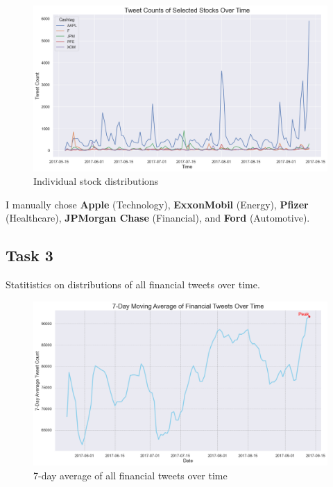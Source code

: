 \documentclass[12pt]{article}
\begin{document}
\begin{figure}[h!]
    \centering
    \includegraphics[width=1\textwidth]{P1.2.png}
    \caption{Individual stock distributions}
    \label{fig:1.2}
\end{figure}

I manually chose \textbf{Apple} (Technology), \textbf{ExxonMobil} (Energy), 
\textbf{Pfizer} (Healthcare), \textbf{JPMorgan Chase} (Financial), 
and \textbf{Ford} (Automotive).

\pagebreak

\subsection{Task 3}

\begin{qsolve}[Task]
    Statitistics on distributions of all financial tweets over time.
\end{qsolve}

\begin{figure}[h!]
    \centering
    \includegraphics[width=1\textwidth]{P1.3.png}
    \caption{7-day average of all financial tweets over time}
    \label{fig:1.3}
\end{figure}
\end{document}
